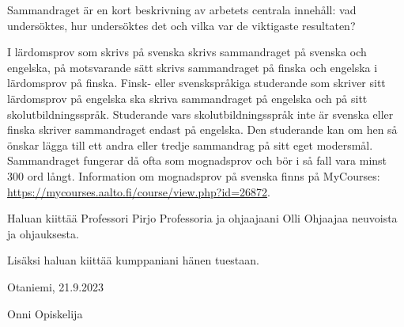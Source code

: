\documentclass[finnish, 12pt, a4paper, elec, utf8, a-2b, online]{aaltothesis}
\begin{document}
\newpage
%
\date{21.9.2023}
\begin{abstractpage}[swedish]
Sammandraget är en kort beskrivning av arbetets centrala innehåll: vad 
undersöktes, hur undersöktes det och vilka var de viktigaste resultaten?

I lärdomsprov som skrivs på svenska skrivs sammandraget på svenska och engelska, 
på motsvarande sätt skrivs sammandraget på finska och engelska i lärdomsprov på 
finska. Finsk- eller svenskspråkiga studerande som skriver sitt lärdomsprov på 
engelska ska skriva sammandraget på engelska och på sitt skolutbildningsspråk. 
Studerande vars skolutbildningsspråk inte är svenska eller finska skriver 
sammandraget endast på engelska. Den studerande kan om hen så önskar lägga till 
ett andra eller tredje sammandrag på sitt eget modersmål. Sammandraget fungerar 
då ofta som mognadsprov och bör i så fall vara minst 300 ord långt. Information 
om mognadsprov på svenska finns på MyCourses:\\
\url{https://mycourses.aalto.fi/course/view.php?id=26872}.
\end{abstractpage}


\dothesispagenumbering{}


Haluan kiittää Professori Pirjo Professoria ja ohjaajaani Olli Ohjaajaa
neuvoista ja ohjauksesta.

Lisäksi haluan kiittää kumppaniani hänen tuestaan.

\vspace{5cm}
Otaniemi, 21.9.2023

\vspace{5mm}
{\hfill Onni Opiskelija \hspace{1cm}}
\end{document}
